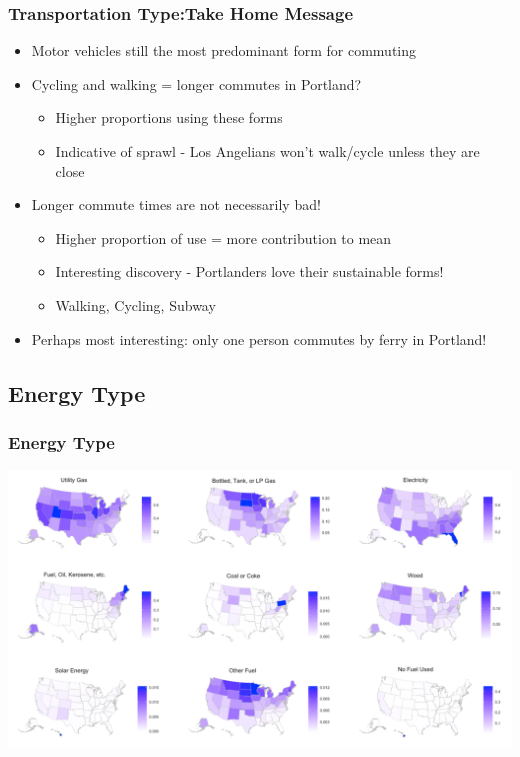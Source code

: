 \documentclass{beamer}
\begin{document}
\begin{frame}
\frametitle{Transportation Type:Take Home Message}
\begin{itemize}
\item Motor vehicles still the most predominant form for commuting
\item Cycling and walking = longer commutes in Portland?
\begin{itemize}
\item Higher proportions using these forms
\item Indicative of sprawl - Los Angelians won't walk/cycle unless they are close
\end{itemize}
\item Longer commute times are not necessarily bad!
\begin{itemize}
\item Higher proportion of use = more contribution to mean
\item Interesting discovery - Portlanders love their sustainable forms!
\item Walking, Cycling, Subway
\end{itemize}
\item Perhaps most interesting: only one person commutes by ferry in Portland!
\end{itemize}

\end{frame}


\subsection{Energy Type}
\begin{frame}
\frametitle{Energy Type}
\begin{center} 
\includegraphics[width=1 \textwidth]{AllStatesEnergyTypes}

\end{center}


\end{frame}
\end{document}
